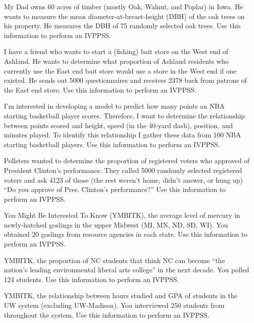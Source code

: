 \documentclass[10pt,openany]{book}\usepackage[]{graphicx}\usepackage[]{color}
\begin{document}
\begin{exsection}
  \item \label{revex:IVPPSSDad}My Dad owns 60 acres of timber (mostly Oak, Walnut, and Poplar) in Iowa.  He wants to measure the mean diameter-at-breast-height (DBH) of the oak trees on his property.  He measures the DBH of 75 randomly selected oak trees.  Use this information to perform an IVPPSS. 
  \item \label{revex:IVPPSSFishStore}I have a friend who wants to start a (fishing) bait store on the West end of Ashland.  He wants to determine what proportion of Ashland residents who currently use the East end bait store would use a store in the West end if one existed.  He sends out 5000 questionnaires and receives 2378 back from patrons of the East end store.   Use this information to perform an IVPPSS.  
  \item \label{revex:IVPPSSNBA}I'm interested in developing a model to predict how many points an NBA starting basketball player scores. Therefore, I want to determine the relationship between points scored and height, speed (in the 40-yard dash), position, and minutes played. To identify this relationship I gather these data from 100 NBA starting basketball players.  Use this information to perform an IVPPSS. 
  \item \label{revex:IVPPSSClinton}Pollsters wanted to determine the proportion of registered voters who approved of President Clinton's performance.  They called 5000 randomly selected registered voters and ask 4123 of those (the rest weren't home, didn't answer, or hung up) ``Do you approve of Pres. Clinton's performance?''  Use this information to perform an IVPPSS. 
  \item \label{revex:IVPPSSGoslings}You Might Be Interested To Know (YMBITK), the average level of mercury in newly-hatched goslings in the upper Midwest (MI, MN, ND, SD, WI). You obtained 20 goslings from resource agencies in each state.  Use this information to perform an IVPPSS. 
  \item \label{revex:IVPPSSNClead}YMBITK, the proportion of NC students that think NC can become ``the nation's leading environmental liberal arts college'' in the next decade. You polled 124 students.  Use this information to perform an IVPPSS. 
  \item \label{revex:IVPPSSStudy}YMBITK, the relationship between hours studied and GPA of students in the UW system (excluding UW-Madison). You interviewed 250 students from throughout the system.  Use this information to perform an IVPPSS. 

\end{exsection}
\end{document}
